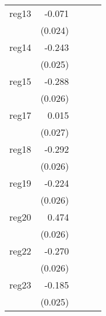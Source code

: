 {\begin{longtable}{l*{4}{D{.}{.}{-1}}}
\addlinespace
reg13       &      -0.071\sym{**} &                     &                     &                     \\
            &     (0.024)         &                     &                     &                     \\
\addlinespace
reg14       &      -0.243\sym{***}&                     &                     &                     \\
            &     (0.025)         &                     &                     &                     \\
\addlinespace
reg15       &      -0.288\sym{***}&                     &                     &                     \\
            &     (0.026)         &                     &                     &                     \\
\addlinespace
reg17       &       0.015         &                     &                     &                     \\
            &     (0.027)         &                     &                     &                     \\
\addlinespace
reg18       &      -0.292\sym{***}&                     &                     &                     \\
            &     (0.026)         &                     &                     &                     \\
\addlinespace
reg19       &      -0.224\sym{***}&                     &                     &                     \\
            &     (0.026)         &                     &                     &                     \\
\addlinespace
reg20       &       0.474\sym{***}&                     &                     &                     \\
            &     (0.026)         &                     &                     &                     \\
\addlinespace
reg22       &      -0.270\sym{***}&                     &                     &                     \\
            &     (0.026)         &                     &                     &                     \\
\addlinespace
reg23       &      -0.185\sym{***}&                     &                     &                     \\
            &     (0.025)         &                     &                     &                     \\

\end{longtable}}
